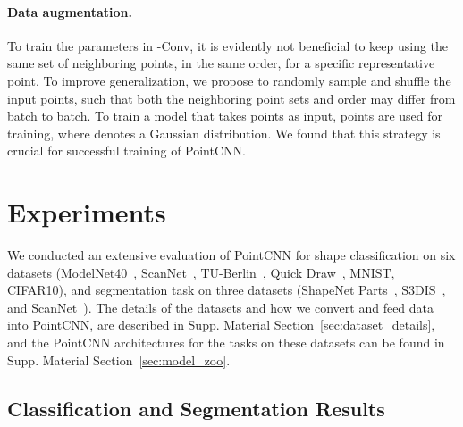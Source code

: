 \documentclass{article}
\begin{document}
\paragraph{Data augmentation.} 
To train the parameters in -Conv, it is evidently not beneficial to keep using the same set of neighboring points, in the same order, for a specific representative point.
To improve generalization, we propose to randomly sample and shuffle the input points, such that both the neighboring point sets and order may differ from batch to batch. To train a model that takes  points as input,  points are used for training, where  denotes a Gaussian distribution. We found that this strategy is crucial for successful training of PointCNN. \section{Experiments}
\label{sec:experiments}

We conducted an extensive evaluation of PointCNN for shape classification on six datasets (ModelNet40~\cite{Wu_CVPR15}, ScanNet~\cite{dai2017scannet}, TU-Berlin~\cite{Eitz_SIGGRAPH12}, Quick Draw~\cite{ha2017neural}, MNIST, CIFAR10), and segmentation task on three datasets (ShapeNet Parts~\cite{Yi_SIGGRAPHAsia16}, S3DIS~\cite{armeni20163d}, and ScanNet~\cite{dai2017scannet}).
The details of the datasets and how we convert and feed data into PointCNN, are described in Supp. Material Section~\ref{sec:dataset_details}, and the PointCNN architectures for the tasks on these datasets can be found in Supp. Material Section~\ref{sec:model_zoo}.

\subsection{Classification and Segmentation Results}
\end{document}
